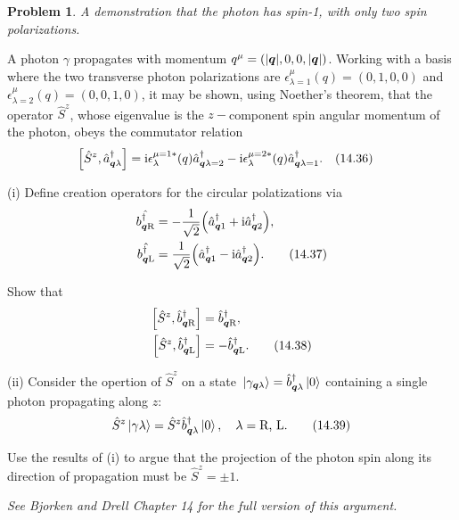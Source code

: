 \documentclass[letterpaper]{article}
\theoremstyle{definition}
\newtheorem{prob}{Problem}[section]
\begin{document}
\begin{prob}
  \emph{A demonstration that the photon has spin-1, with only two spin polarizations.}

  A photon \(\gamma\) propagates with momentum \(q^\mu=(|\vb*{q}|,0,0,|\vb*{q}|)\). Working with a basis where the two transverse photon polarizations are \(\epsilon^\mu_{\lambda=1}(q)=(0,1,0,0)\) and \(\epsilon^\mu_{\lambda=2}(q)=(0,0,1,0)\), it may be shown, using Noether's theorem, that the operator \(\hat{S}^z\), whose eigenvalue is the \(z-\)component spin angular momentum of the photon, obeys the commutator relation \[\bqty{\hat{S}^z,\hat{a}^\dagger_{\vb*{q}\lambda}}=\text{i}\epsilon^{\mu=1*}_\lambda(q)\hat{a}^\dagger_{\vb*{q}\lambda=2}-\text{i}\epsilon^{\mu=2*}_\lambda(q)\hat{a}^\dagger_{\vb*{q}\lambda=1}.\qq{(14.36)}\]

  (i) Define creation operators for the circular polatizations via
  \begin{align*}\hat{b^\dagger_{\vb*{q}\text{R}}}&=-\frac{1}{\sqrt{2}}\pqty{\hat{a}^\dagger_{\vb*{q}1}+\text{i}\hat{a}^\dagger_{\vb*{q}2}},\\\hat{b^\dagger_{\vb*{q}\text{L}}}&=\frac{1}{\sqrt{2}}\pqty{\hat{a}^\dagger_{\vb*{q}1}-\text{i}\hat{a}^\dagger_{\vb*{q}2}}.\qquad(14.37) \end{align*}


  Show that\begin{align*}\bqty{\hat{S}^z,\hat{b}^\dagger_{\vb*{q}\text{R}}}&=\hat{b}^\dagger_{\vb*{q}\text{R}},\\\bqty{\hat{S}^z,\hat{b}^\dagger_{\vb*{q}\text{L}}}&=-\hat{b}^\dagger_{\vb*{q}\text{L}}.\qquad(14.38)\end{align*}

  (ii) Consider the opertion of \(\hat{S}^z\) on a state \(\ket*{\gamma_{\vb*{q}\lambda}}=\hat{b}^\dagger_{\vb*{q}\lambda}\ket*{0}\) containing a single photon propagating along \(z\):\[\hat{S}^z\ket*{\gamma\lambda}=\hat{S}^z\hat{b}^\dagger_{\vb*{q}\lambda}\ket*{0}\qcomma\lambda=\text{R, L.}\qquad(14.39)\]

  Use the results of (i) to argue that the projection of the photon spin along its direction of propagation must be \(\hat{S}^z=\pm 1.\)

  \emph{See Bjorken and Drell Chapter 14 for the full version of this argument.}
\end{prob}
\end{document}
